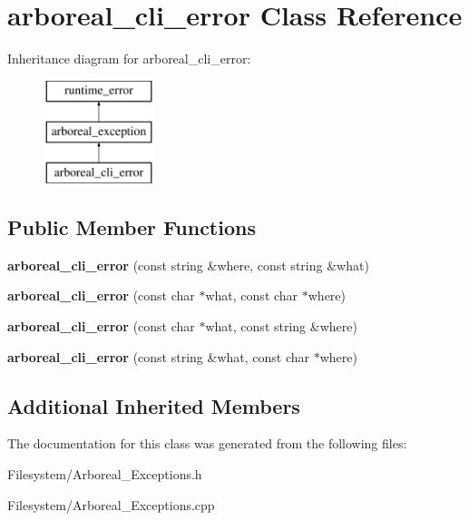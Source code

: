 \hypertarget{classarboreal__cli__error}{}\section{arboreal\+\_\+cli\+\_\+error Class Reference}
\label{classarboreal__cli__error}
Inheritance diagram for arboreal\+\_\+cli\+\_\+error\+:\begin{figure}[H]
\begin{center}
\leavevmode
\includegraphics[height=3.000000cm]{classarboreal__cli__error}
\end{center}
\end{figure}
\subsection*{Public Member Functions}
\begin{DoxyCompactItemize}
\item 
\mbox{\label{classarboreal__cli__error_adb30829287a850a83b93e0245af009fb}} 
{\bfseries arboreal\+\_\+cli\+\_\+error} (const string \&where, const string \&what)
\item 
\mbox{\label{classarboreal__cli__error_aa646f7d9ff21be0b3b3259b5541f9a8c}} 
{\bfseries arboreal\+\_\+cli\+\_\+error} (const char $\ast$what, const char $\ast$where)
\item 
\mbox{\label{classarboreal__cli__error_a26ba02d0ddf2891265734b4a6ec6667e}} 
{\bfseries arboreal\+\_\+cli\+\_\+error} (const char $\ast$what, const string \&where)
\item 
\mbox{\label{classarboreal__cli__error_a7089cb20c257590360d447f77cfdd3b5}} 
{\bfseries arboreal\+\_\+cli\+\_\+error} (const string \&what, const char $\ast$where)
\end{DoxyCompactItemize}
\subsection*{Additional Inherited Members}


The documentation for this class was generated from the following files\+:\begin{DoxyCompactItemize}
\item 
Filesystem/Arboreal\+\_\+\+Exceptions.\+h\item 
Filesystem/Arboreal\+\_\+\+Exceptions.\+cpp\end{DoxyCompactItemize}
